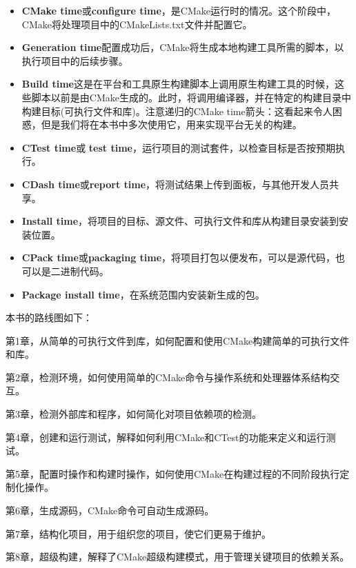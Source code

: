 \begin{itemize}
\item \textbf{CMake time}或\textbf{configure time}，是CMake运行时的情况。这个阶段中，CMake将处理项目中的CMakeLists.txt文件并配置它。

\item \textbf{Generation time}配置成功后，CMake将生成本地构建工具所需的脚本，以执行项目中的后续步骤。

\item \textbf{Build time}这是在平台和工具原生构建脚本上调用原生构建工具的时候，这些脚本以前是由CMake生成的。此时，将调用编译器，并在特定的构建目录中构建目标(可执行文件和库)。注意递归的CMake time箭头：这看起来令人困惑，但是我们将在本书中多次使用它，用来实现平台无关的构建。

\item \textbf{CTest time}或 \textbf{test time}，运行项目的测试套件，以检查目标是否按预期执行。

\item \textbf{CDash time}或\textbf{report time}，将测试结果上传到面板，与其他开发人员共享。

\item \textbf{Install time}，将项目的目标、源文件、可执行文件和库从构建目录安装到安装位置。

\item \textbf{CPack time}或\textbf{packaging time}，将项目打包以便发布，可以是源代码，也可以是二进制代码。

\item \textbf{Package install time}，在系统范围内安装新生成的包。

\end{itemize}

本书的路线图如下：

第1章，从简单的可执行文件到库，如何配置和使用CMake构建简单的可执行文件和库。

第2章，检测环境，如何使用简单的CMake命令与操作系统和处理器体系结构交互。

第3章，检测外部库和程序，如何简化对项目依赖项的检测。

第4章，创建和运行测试，解释如何利用CMake和CTest的功能来定义和运行测试。

第5章，配置时操作和构建时操作，如何使用CMake在构建过程的不同阶段执行定制化操作。

第6章，生成源码，CMake命令可自动生成源码。

第7章，结构化项目，用于组织您的项目，使它们更易于维护。

第8章，超级构建，解释了CMake超级构建模式，用于管理关键项目的依赖关系。

